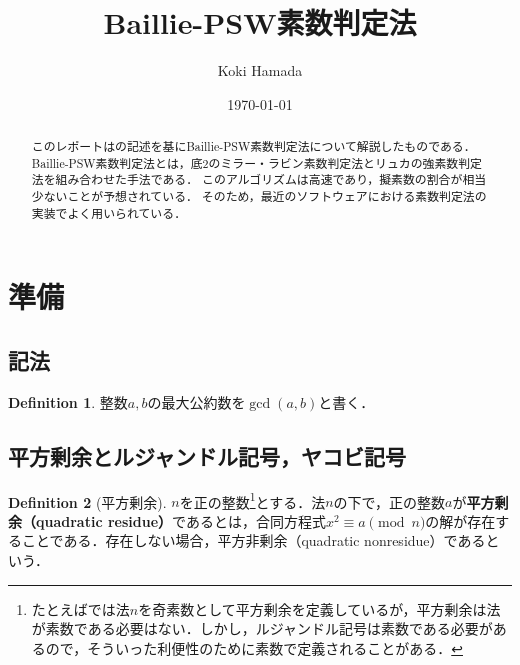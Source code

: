 \documentclass[uplatex]{jsarticle}
\title{Baillie-PSW素数判定法}
\author{Koki Hamada}
\date{\today}
\theoremstyle{definition}
\newtheorem{dfn}{Definition}[section]
\begin{document}
\maketitle

\begin{abstract}
このレポートは\cite{baillie2021strengthening}の記述を基にBaillie-PSW素数判定法について解説したものである．
Baillie-PSW素数判定法とは，底2のミラー・ラビン素数判定法とリュカの強素数判定法を組み合わせた手法である．
このアルゴリズムは高速であり，擬素数の割合が相当少ないことが予想されている．
そのため，最近のソフトウェアにおける素数判定法の実装でよく用いられている．

\end{abstract} 

\section{準備}

\subsection{記法}

\begin{dfn}
    整数$a, b$の最大公約数を$\gcd(a,b)$と書く．
\end{dfn}




\subsection{平方剰余とルジャンドル記号，ヤコビ記号}

\begin{dfn}[平方剰余]
$n$を正の整数\footnote{たとえば\cite{stein2008elementary,takagi}では法$n$を奇素数として平方剰余を定義しているが，平方剰余は法が素数である必要はない．しかし，ルジャンドル記号は素数である必要があるので，そういった利便性のために素数で定義されることがある．}とする．法$n$の下で，正の整数$a$が\textbf{平方剰余（quadratic residue）}であるとは，合同方程式$x^2 \equiv a \pmod{n}$の解が存在することである．存在しない場合，平方非剰余（quadratic nonresidue）であるという．
\end{dfn}
\end{document}
